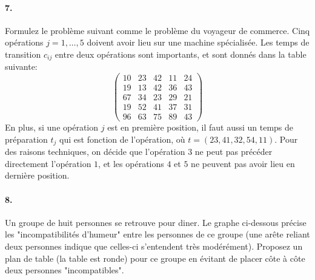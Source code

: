 \paragraph{7. } Formulez le problème suivant comme le problème du voyageur de commerce. Cinq opérations $j=1,…,5$ doivent avoir lieu sur une machine spécialisée. Les temps de transition $c_{ij}$ entre deux opérations sont importants, et sont donnés dans la table suivante:
\begin{equation}
  \left( \begin{matrix}
      10 & 23 & 42 & 11 & 24 \\
      19 & 13 & 42 & 36 & 43 \\
      67 & 34 & 23 & 29 & 21 \\
      19 & 52 & 41 & 37 & 31 \\
      96 & 63 & 75 & 89 & 43
  \end{matrix}  \right)
\end{equation}
En plus, si une opération $j$ est en première position, il faut aussi un temps de préparation $t_j$ qui est fonction de l'opération, où $t=(23,41,32,54,11)$. Pour des raisons techniques, on décide que l'opération $3$ ne peut pas précéder directement l'opération $1$, et les opérations $4$ et $5$ ne peuvent pas avoir lieu en dernière position.

\paragraph{8. } Un groupe de huit personnes se retrouve pour diner. Le graphe ci-dessous précise les "incompatibilités d'humeur" entre les personnes de ce groupe (une arête reliant deux personnes indique que celles-ci s'entendent très modérément). Proposez un plan de table (la table est ronde) pour ce groupe en évitant de placer côte à côte deux personnes "incompatibles".

\begin{figure}[h!]
  \begin{center}
  \end{center}
\end{figure}

